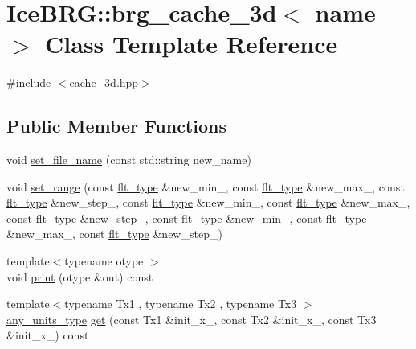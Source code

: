 \hypertarget{classIceBRG_1_1brg__cache__3d}{}\section{Ice\+B\+R\+G\+:\+:brg\+\_\+cache\+\_\+3d$<$ name $>$ Class Template Reference}
\label{classIceBRG_1_1brg__cache__3d}


{\ttfamily \#include $<$cache\+\_\+3d.\+hpp$>$}

\subsection*{Public Member Functions}
\begin{DoxyCompactItemize}
\item 
void \hyperlink{classIceBRG_1_1brg__cache__3d_a2cb9d485713aed3e56667013f9309d54}{set\+\_\+file\+\_\+name} (const std\+::string new\+\_\+name)
\item 
void \hyperlink{classIceBRG_1_1brg__cache__3d_af3aafe0ab4f5757a0beefaee5067e013}{set\+\_\+range} (const \hyperlink{lib_2IceBRG__main_2common_8h_ad0f130a56eeb944d9ef2692ee881ecc4}{flt\+\_\+type} \&new\+\_\+min\+\_, const \hyperlink{lib_2IceBRG__main_2common_8h_ad0f130a56eeb944d9ef2692ee881ecc4}{flt\+\_\+type} \&new\+\_\+max\+\_, const \hyperlink{lib_2IceBRG__main_2common_8h_ad0f130a56eeb944d9ef2692ee881ecc4}{flt\+\_\+type} \&new\+\_\+step\+\_, const \hyperlink{lib_2IceBRG__main_2common_8h_ad0f130a56eeb944d9ef2692ee881ecc4}{flt\+\_\+type} \&new\+\_\+min\+\_, const \hyperlink{lib_2IceBRG__main_2common_8h_ad0f130a56eeb944d9ef2692ee881ecc4}{flt\+\_\+type} \&new\+\_\+max\+\_, const \hyperlink{lib_2IceBRG__main_2common_8h_ad0f130a56eeb944d9ef2692ee881ecc4}{flt\+\_\+type} \&new\+\_\+step\+\_, const \hyperlink{lib_2IceBRG__main_2common_8h_ad0f130a56eeb944d9ef2692ee881ecc4}{flt\+\_\+type} \&new\+\_\+min\+\_, const \hyperlink{lib_2IceBRG__main_2common_8h_ad0f130a56eeb944d9ef2692ee881ecc4}{flt\+\_\+type} \&new\+\_\+max\+\_, const \hyperlink{lib_2IceBRG__main_2common_8h_ad0f130a56eeb944d9ef2692ee881ecc4}{flt\+\_\+type} \&new\+\_\+step\+\_)
\item 
{\footnotesize template$<$typename otype $>$ }\\void \hyperlink{classIceBRG_1_1brg__cache__3d_a514ff3b5f9bec00706eaceeefa82d3a2}{print} (otype \&out) const 
\item 
{\footnotesize template$<$typename Tx1 , typename Tx2 , typename Tx3 $>$ }\\\hyperlink{namespaceIceBRG_a3101fc159e191fa99c4ec14e445df96e}{any\+\_\+units\+\_\+type} \hyperlink{classIceBRG_1_1brg__cache__3d_aa7c731a33469c00810417598a942dbc9}{get} (const Tx1 \&init\+\_\+x\+\_, const Tx2 \&init\+\_\+x\+\_, const Tx3 \&init\+\_\+x\+\_) const 

\end{DoxyCompactItemize}
